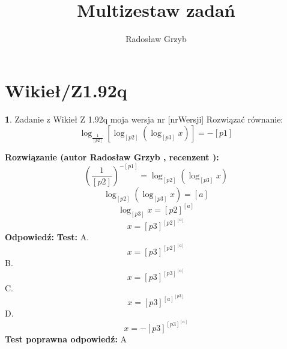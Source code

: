 \documentclass[12pt, a4paper]{article}
\title{Multizestaw zadań}
\author{Radosław Grzyb}
\date{}
\theoremstyle{definition} %
\newtheorem{zad}{}
\newcommand{\kategoria}[1]{\section{#1}} %
\newcommand{\zadStart}[1]{\begin{zad}#1\newline} %
\newcommand{\zadStop}{\end{zad}}   %
\newcommand{\rozwStart}[2]{\noindent \textbf{Rozwiązanie (autor #1 , recenzent #2): }\newline} %
\newcommand{\rozwStop}{\newline}                                            %
\newcommand{\odpStart}{\noindent \textbf{Odpowiedź:}\newline}    %
\newcommand{\odpStop}{\newline}                                             %
\newcommand{\testStart}{\noindent \textbf{Test:}\newline} %
\newcommand{\testStop}{\newline} %
\newcommand{\kluczStart}{\noindent \textbf{Test poprawna odpowiedź:}\newline} %
\newcommand{\kluczStop}{\newline} %
\begin{document}
\maketitle
\kategoria{Wikieł/Z1.92q}
\zadStart{Zadanie z Wikieł Z 1.92q moja wersja nr [nrWersji]}
Rozwiązać równanie:
$$\log_{\frac{1}{[p2]}}[\log_{[p2]}(\log_{[p3]}x)]=-[p1]$$
\zadStop
\rozwStart{Radosław Grzyb}{}
$$(\frac{1}{[p2]})^{-[p1]}=\log_{[p2]}(\log_{[p3]}x)$$
$$\log_{[p2]}(\log_{[p3]}x)=[a]$$
$$\log_{[p3]}x=[p2]^{[a]}$$
$$x=[p3]^{[p2]^{[a]}}$$
\rozwStop
\odpStart
\odpStop
\testStart
A.$$x=[p3]^{[p2]^{[a]}}$$
B.$$x=[p3]^{[p3]^{[a]}}$$
C.$$x=[p3]^{[a]^{[p3]}}$$
D.$$x=-[p3]^{[p3]^{[a]}}$$
\testStop
\kluczStart
A
\kluczStop
\end{document}
